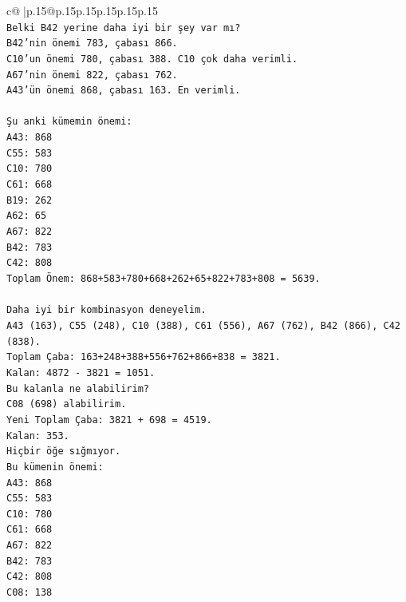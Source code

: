 \documentclass{article}
\begin{document}
{\begin{supertabular}{c@{$\;$}|p{.15\linewidth}@{}p{.15\linewidth}p{.15\linewidth}p{.15\linewidth}p{.15\linewidth}p{.15\linewidth}}
{{{\\ 
\texttt{Belki B42 yerine daha iyi bir şey var mı?} \\
\texttt{B42'nin önemi 783, çabası 866.} \\
\texttt{C10'un önemi 780, çabası 388. C10 çok daha verimli.} \\
\texttt{A67'nin önemi 822, çabası 762.} \\
\texttt{A43'ün önemi 868, çabası 163. En verimli.} \\
\\ 
\texttt{Şu anki kümemin önemi:} \\
\texttt{A43: 868} \\
\texttt{C55: 583} \\
\texttt{C10: 780} \\
\texttt{C61: 668} \\
\texttt{B19: 262} \\
\texttt{A62: 65} \\
\texttt{A67: 822} \\
\texttt{B42: 783} \\
\texttt{C42: 808} \\
\texttt{Toplam Önem: 868+583+780+668+262+65+822+783+808 = 5639.} \\
\\ 
\texttt{Daha iyi bir kombinasyon deneyelim.} \\
\texttt{A43 (163), C55 (248), C10 (388), C61 (556), A67 (762), B42 (866), C42 (838).} \\
\texttt{Toplam Çaba: 163+248+388+556+762+866+838 = 3821.} \\
\texttt{Kalan: 4872 {-} 3821 = 1051.} \\
\texttt{Bu kalanla ne alabilirim?} \\
\texttt{C08 (698) alabilirim.} \\
\texttt{Yeni Toplam Çaba: 3821 + 698 = 4519.} \\
\texttt{Kalan: 353.} \\
\texttt{Hiçbir öğe sığmıyor.} \\
\texttt{Bu kümenin önemi:} \\
\texttt{A43: 868} \\
\texttt{C55: 583} \\
\texttt{C10: 780} \\
\texttt{C61: 668} \\
\texttt{A67: 822} \\
\texttt{B42: 783} \\
\texttt{C42: 808} \\
\texttt{C08: 138} \\
}}}
\end{supertabular}}
\end{document}
